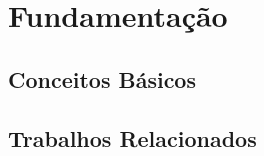 \chapter{Fundamentação} \label{ch:fundamentation}

\section{Conceitos Básicos}

\section{Trabalhos Relacionados}